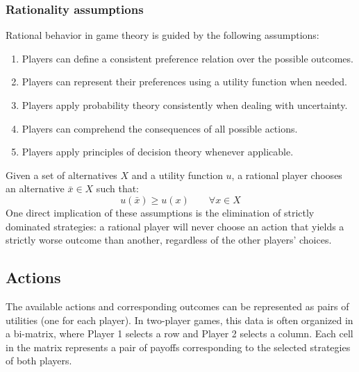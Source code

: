 \subsubsection{Rationality assumptions}
Rational behavior in game theory is guided by the following assumptions:
\begin{enumerate}
    \item Players can define a consistent preference relation over the possible outcomes.
    \item Players can represent their preferences using a utility function when needed.
    \item Players apply probability theory consistently when dealing with uncertainty.
    \item Players can comprehend the consequences of all possible actions.
    \item Players apply principles of decision theory whenever applicable.
\end{enumerate}
\noindent Given a set of alternatives $X$ and a utility function $u$, a rational player chooses an alternative $\bar{x} \in X$ such that:
\[u(\bar{x}) \geq u(x)\qquad\forall x \in X\]
One direct implication of these assumptions is the elimination of strictly dominated strategies: a rational player will never choose an action that yields a strictly worse outcome than another, regardless of the other players' choices.

\subsection{Actions}
The available actions and corresponding outcomes can be represented as pairs of utilities (one for each player). 
In two-player games, this data is often organized in a bi-matrix, where Player 1 selects a row and Player 2 selects a column.
Each cell in the matrix represents a pair of payoffs corresponding to the selected strategies of both players.